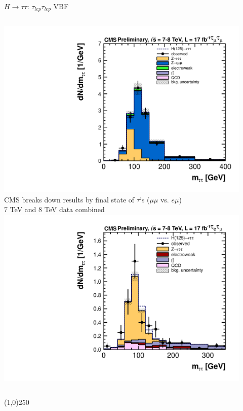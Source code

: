 \documentclass{beamer}
\begin{document}
\begin{frame}{$H \rightarrow \tau\tau$: $\tau_{lep}\tau_{lep}$ VBF}
	\begin{columns}[c]
			\includegraphics[width=0.92\textwidth]{figures/cms_htautau_mumu_VBF.pdf} \\	
		 \scriptsize
			CMS breaks down results by final state of $\tau$`s ($\mu \mu$ vs. $e\mu$) \\ 
			\textcolor{BrickRed}{7 TeV and 8 TeV data combined}
			\includegraphics[width=0.92\textwidth]{figures/cms_htautau_emu_VBF.pdf}	
	\end{columns}
	
	\begin{center}
	\line(1,0){250}
	\end{center}
	

\end{frame}
\end{document}
